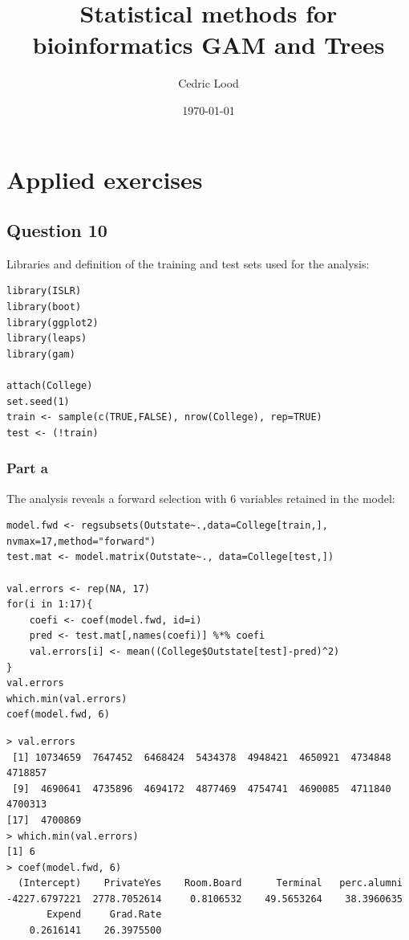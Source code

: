 \documentclass[11pt, a4paper]{article}
\title{Statistical methods for bioinformatics \linebreak GAM and Trees}
\author{Cedric Lood}
\date{\today}
\begin{document}
\maketitle


\graphicspath{ {figures/} }
\setlength{\droptitle}{-5em} 
\setlength{\parindent}{0cm}

\section{Applied exercises}
\label{sec-1}
\subsection{Question 10}
\label{sec-1-1}

Libraries and definition of the training and test sets used for the
analysis:

\begin{verbatim}
library(ISLR)
library(boot)
library(ggplot2)
library(leaps)
library(gam)

attach(College)
set.seed(1)
train <- sample(c(TRUE,FALSE), nrow(College), rep=TRUE)
test <- (!train)
\end{verbatim}
\subsubsection{Part a}
\label{sec-1-1-1}

The analysis reveals a forward selection with 6 variables retained in
the model:


\begin{verbatim}
model.fwd <- regsubsets(Outstate~.,data=College[train,], nvmax=17,method="forward")
test.mat <- model.matrix(Outstate~., data=College[test,])

val.errors <- rep(NA, 17)
for(i in 1:17){
    coefi <- coef(model.fwd, id=i)
    pred <- test.mat[,names(coefi)] %*% coefi
    val.errors[i] <- mean((College$Outstate[test]-pred)^2)
}
val.errors
which.min(val.errors)
coef(model.fwd, 6)
\end{verbatim}


\begin{verbatim}
> val.errors
 [1] 10734659  7647452  6468424  5434378  4948421  4650921  4734848  4718857
 [9]  4690641  4735896  4694172  4877469  4754741  4690085  4711840  4700313
[17]  4700869
> which.min(val.errors)
[1] 6
> coef(model.fwd, 6)
  (Intercept)    PrivateYes    Room.Board      Terminal   perc.alumni 
-4227.6797221  2778.7052614     0.8106532    49.5653264    38.3960635 
       Expend     Grad.Rate 
    0.2616141    26.3975500
\end{verbatim}
\end{document}

